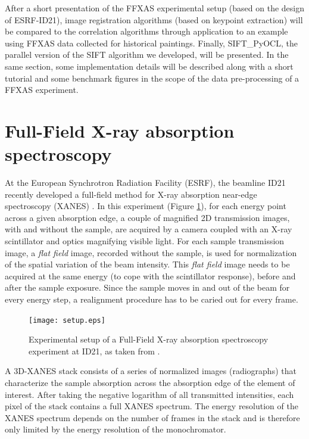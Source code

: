 \documentclass[preprint]{iucr}
\begin{document}
After a short presentation of the FFXAS
experimental setup (based on the design of ESRF-ID21), image registration
algorithms (based on keypoint extraction) will
be compared to the correlation algorithms through application to an example
using FFXAS data collected for historical paintings.
Finally, SIFT\_PyOCL, the parallel version of the SIFT algorithm we developed,
will be presented. In the same section, some implementation details will be
described along with a short tutorial and some benchmark
figures in the scope of the data pre-processing of a FFXAS experiment.

\section{Full-Field X-ray absorption spectroscopy}
At the European Synchrotron Radiation Facility (ESRF), the beamline ID21
recently developed a full-field method for X-ray absorption near-edge
spectroscopy (XANES) \cite{andrade,fullfield}.
In this experiment (Figure \ref{setup}), for each energy point across a given
absorption edge, a couple of magnified 2D transmission images, with and
without the sample, are acquired by a camera coupled with an
X-ray scintillator and optics magnifying visible light.
For each sample transmission image, a \emph{flat field} image,
recorded without the sample, is used for normalization of the spatial
variation of the beam intensity.
This \emph{flat field} image needs to be acquired at the same energy (to cope
with the scintillator response), before and after the sample exposure.
Since the sample moves in and out of the beam for every energy step, a
realignment procedure has to be caried out for every frame.

\begin{figure}
\label{setup}
\begin{center}
\texttt{[image: setup.eps]}
\caption{Experimental setup of a Full-Field X-ray absorption
spectroscopy experiment at ID21, as taken from \cite{fullfield}.}
\end{center}
\end{figure}

A 3D-XANES stack consists of a series of normalized images (radiographs) that
characterize the sample absorption across the absorption edge of the
element of interest.
After taking the negative logarithm of all transmitted intensities, each
pixel of the stack contains a full XANES spectrum.
The energy resolution of the XANES spectrum depends on the number of frames in
the stack and is therefore only limited by the energy resolution of the
monochromator.
\end{document}
